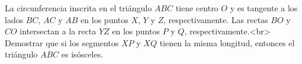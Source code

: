 La circunferencia inscrita en el triángulo $ABC$ tiene centro $O$ y es tangente a los lados $BC$, $AC$ y $AB$ en los puntos $X$, $Y$ y $Z$, respectivamente. Las rectas $BO$ y $CO$ intersectan a la recta $YZ$ en los puntos $P$ y $Q$, respectivamente.<br>
Demostrar que si los segmentos $XP$ y $XQ$ tienen la misma longitud, entonces el triángulo $ABC$ es isósceles.
